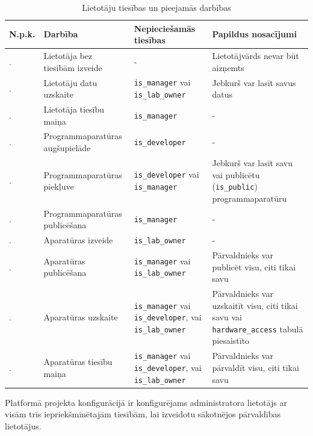 \begin{table}[H]
    \newcommand\rownumber{\stepcounter{permissioncounter}\arabic{permissioncounter}.}
    \begin{tabular}{ |p{1cm}|p{5cm}|p{3cm}|p{6cm}| }
    \hline
    N.p.k.&Darbība&Nepieciešamās tiesības&Papildus nosacījumi \\
    \hline
    \rownumber & Lietotāja bez tiesībām izveide & - & Lietotājvārds nevar būt aizņemts \\
    \hline
    \rownumber & Lietotāju datu uzskaite & \lstinline!is_manager! vai \lstinline!is_lab_owner! & Jebkurš var lasīt savus datus \\
    \hline
    \rownumber & Lietotāja tiesību maiņa & \lstinline!is_manager! & - \\
    \hline
    \rownumber & Programmaparatūras augšupielāde & \lstinline!is_developer! & - \\
    \hline
    \rownumber & Programmaparatūras piekļuve & \lstinline!is_developer! vai
        \lstinline!is_manager! & Jebkurš var lasīt savu vai publicētu
        (\lstinline!is_public!) programmaparatūru \\
    \hline
    \rownumber & Programmaparatūras publicēšana & \lstinline!is_manager! & - \\
    \hline
    \rownumber & Aparatūras izveide & \lstinline!is_lab_owner! & - \\
    \hline
    \rownumber & Aparatūras publicēšana & \lstinline!is_manager! vai
        \lstinline!is_lab_owner! & Pārvaldnieks var publicēt visu, citi tikai
        savu \\
    \hline
    \rownumber & Aparatūras uzskaite & \lstinline!is_manager! vai
        \lstinline!is_developer!, vai \lstinline!is_lab_owner! & Pārvaldnieks
        var uzskaitīt visu, citi tikai savu vai \lstinline!hardware_access!
        tabulā piesaistīto \\
    \hline
    \rownumber & Aparatūras tiesību maiņa & \lstinline!is_manager! vai
        \lstinline!is_developer!, vai \lstinline!is_lab_owner! & Pārvaldnieks
        var pārvaldīt visu, citi tikai savu \\
    \hline
    \end{tabular}
    \centering
    \captionsetup{justification=centering}
    \caption{Lietotāju tiesības un pieejamās darbības}
    \label{table:permissions}
\end{table}

Platformā projekta  konfigurācijā ir
konfigurējams administratora lietotājs ar visām trīs iepriekšminētajām tiesībām,
lai izveidotu sākotnējos pārvaldības lietotājus.

